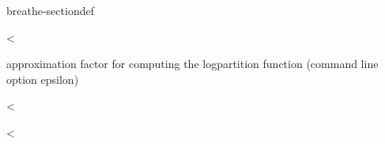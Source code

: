 \documentclass[letterpaper,10pt,openany,oneside,english]{sphinxmanual}
\begin{document}
\begin{fulllineitems}
\begin{sphinxuseclass}{breathe-sectiondef}
\begin{fulllineitems}
\end{fulllineitems}


\begin{fulllineitems}
\label{\detokenize{ref/ref_cpp:_CPPv4N8ToulBar27uaievalE}}\label{\detokenize{ref/ref_cpp:_CPPv3N8ToulBar27uaievalE}}\label{\detokenize{ref/ref_cpp:_CPPv2N8ToulBar27uaievalE}}\label{\detokenize{ref/ref_cpp:ToulBar2::uaieval__b}}
\pysigstartsignatures
\pysigstartmultiline
{}
\pysigstopmultiline
\pysigstopsignatures
\sphinxAtStartPar
\textless{} 

\sphinxAtStartPar
approximation factor for computing the log\sphinxhyphen{}partition function (command line option \sphinxhyphen{}epsilon) 

\end{fulllineitems}


\begin{fulllineitems}
\label{\detokenize{ref/ref_cpp:_CPPv4N8ToulBar212stdin_formatE}}\label{\detokenize{ref/ref_cpp:_CPPv3N8ToulBar212stdin_formatE}}\label{\detokenize{ref/ref_cpp:_CPPv2N8ToulBar212stdin_formatE}}\label{\detokenize{ref/ref_cpp:ToulBar2::stdin_format__string}}
\pysigstartsignatures
\pysigstartmultiline
{}
\pysigstopmultiline
\pysigstopsignatures
\sphinxAtStartPar
\textless{} 

\end{fulllineitems}


\begin{fulllineitems}
\label{\detokenize{ref/ref_cpp:_CPPv4N8ToulBar212startCpuTimeE}}\label{\detokenize{ref/ref_cpp:_CPPv3N8ToulBar212startCpuTimeE}}\label{\detokenize{ref/ref_cpp:_CPPv2N8ToulBar212startCpuTimeE}}\label{\detokenize{ref/ref_cpp:ToulBar2::startCpuTime__double}}
\pysigstartsignatures
\pysigstartmultiline
{}
\pysigstopmultiline
\pysigstopsignatures
\sphinxAtStartPar
\textless{} 


\end{fulllineitems}
\end{sphinxuseclass}
\end{fulllineitems}
\end{document}
